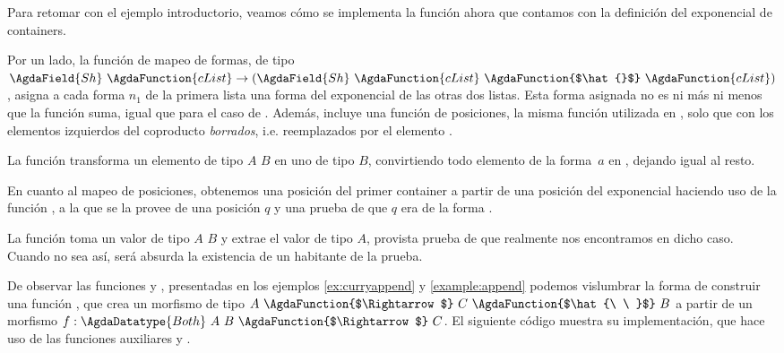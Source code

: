 \addtocounter{definition}{-2}
\begin{example}[Continuación] \label{ex:curryappend}

  Para retomar con el ejemplo introductorio, veamos cómo se implementa la función  ahora que contamos con la definición del exponencial de containers. 


  Por un lado, la función de mapeo de formas, de tipo $\AgdaField{Sh}\ \AgdaFunction{cList}  \to (\AgdaField{Sh}\ \AgdaFunction{cList}\ \AgdaFunction{$\hat{}$}\ \AgdaFunction{cList})$, asigna a cada forma $n_1$ de la primera lista una forma del exponencial de las otras dos listas. Esta forma asignada no es ni más ni menos que la función suma, igual que para el caso de . Además, incluye una función de posiciones, la misma función  utilizada en , solo que con los elementos izquierdos del coproducto {\it borrados}, i.e. reemplazados por el elemento .
 
La función  transforma un elemento de tipo $A$ \AgdaFunction{$\uplus$} $B$ en uno de tipo \AgdaFunction{$\top$} \AgdaFunction{$\uplus$} $B$, convirtiendo todo elemento de la forma $\, a$ en , dejando igual al resto.


En cuanto al mapeo de posiciones, obtenemos una posición del primer container a partir de una posición del exponencial haciendo uso de la función , a la que se la provee de una posición $q$ y una prueba de que $q$ era de la forma .

La función  toma un valor de tipo $A$ \AgdaFunction{$\uplus$} $B$ y extrae el valor de tipo $A$, provista prueba de que realmente nos encontramos en dicho caso. Cuando no sea así, será absurda la existencia de un habitante de la prueba.  


\end{example}
\addtocounter{definition}{1}

De observar las funciones  y , presentadas en los ejemplos  \ref{ex:curryappend} y \ref{example:append} podemos vislumbrar la forma de construir una función \AgdaFunction{$\curry{\_}$}, que crea un morfismo de tipo $A \ \AgdaFunction{$\Rightarrow$}\  C\ \AgdaFunction{$\hat{\ \ }$}\ B$ a partir de un morfismo $f : \AgdaDatatype{Both}\ A\ B \ \AgdaFunction{$\Rightarrow$}\  C$. El siguiente código muestra su implementación, que hace uso de las funciones auxiliares  y  .


